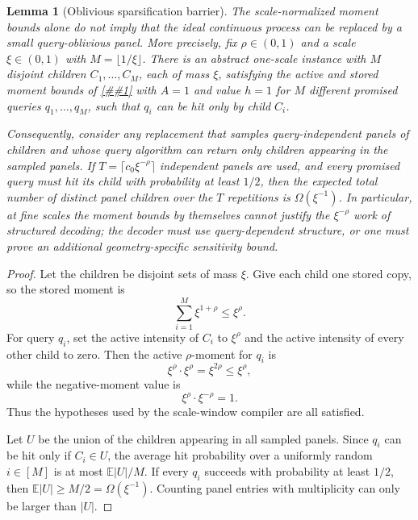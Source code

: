 \documentclass[10pt]{article}
\newcommand{\cref}[1]{\ref{##1}}
\newtheorem{lemma}[theorem]{Lemma}
\theoremstyle{definition}
\newcommand{\E}{\mathbb{E}}
\begin{document}
\begin{lemma}[Oblivious sparsification barrier]\label{lem:oblivious-sparsification-barrier}
   The scale-normalized moment bounds alone do not imply that the ideal
   continuous process can be replaced by a small query-oblivious panel. More
   precisely, fix $\rho\in(0,1)$ and a scale $\xi\in(0,1)$ with
   $M=\lfloor 1/\xi\rfloor$. There is an abstract one-scale instance with
   $M$ disjoint children $C_1,\ldots,C_M$, each of mass $\xi$, satisfying
   the active and stored moment bounds of \cref{lem:scale-window-compiler}
   with $A=1$ and value $h=1$ for $M$ different promised queries
   $q_1,\ldots,q_M$, such that $q_i$ can be hit only by child $C_i$.

   Consequently, consider any replacement that samples query-independent
   panels of children and whose query algorithm can return only children
   appearing in the sampled panels. If
   $T=\lceil c_0\xi^{-\rho}\rceil$ independent panels are used, and every
   promised query must hit its child with probability at least $1/2$, then the
   expected total number of distinct panel children over the $T$ repetitions is
   $\Omega(\xi^{-1})$. In particular, at fine scales the moment bounds by
   themselves cannot justify the $\xi^{-\rho}$ work of structured decoding; the
   decoder must use query-dependent structure, or one must prove an additional
   geometry-specific sensitivity bound.
\end{lemma}

\begin{proof}
   Let the children be disjoint sets of mass $\xi$. Give each child one stored
   copy, so the stored moment is
   \[
      \sum_{i=1}^M \xi^{1+\rho}\le \xi^\rho .
   \]
   For query $q_i$, set the active intensity of $C_i$ to $\xi^\rho$ and the
   active intensity of every other child to zero. Then the active
   $\rho$-moment for $q_i$ is
   \[
      \xi^\rho\cdot \xi^\rho=\xi^{2\rho}\le\xi^\rho ,
   \]
   while the negative-moment value is
   \[
      \xi^\rho\cdot \xi^{-\rho}=1 .
   \]
   Thus the hypotheses used by the scale-window compiler are all satisfied.

   Let $U$ be the union of the children appearing in all sampled panels. Since
   $q_i$ can be hit only if $C_i\in U$, the average hit probability over a
   uniformly random $i\in[M]$ is at most $\E |U|/M$. If every $q_i$ succeeds
   with probability at least $1/2$, then $\E |U|\ge M/2=\Omega(\xi^{-1})$.
   Counting panel entries with multiplicity can only be larger than $|U|$.
\end{proof}
\end{document}
